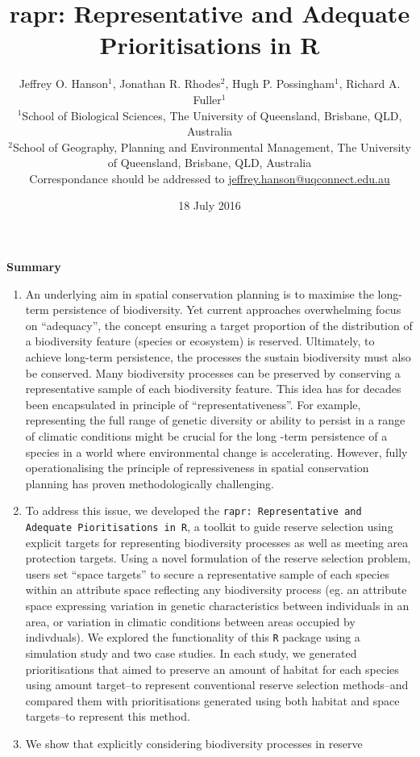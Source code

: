 \documentclass[11pt,]{article}
\title{rapr: Representative and Adequate Prioritisations in R}
\author{Jeffrey O. Hanson$^1$, Jonathan R. Rhodes$^2$, Hugh P. Possingham$^1$,
Richard A. Fuller$^1$\\$^1$School of Biological Sciences, The University
of Queensland, Brisbane, QLD, Australia\\$^2$School of Geography,
Planning and Environmental Management, The University of Queensland,
Brisbane, QLD, Australia\\Correspondance should be addressed to
\href{mailto:jeffrey.hanson@uqconnect.edu.au}{jeffrey.hanson@uqconnect.edu.au}}
\date{18 July 2016}
\renewcommand{\abstractname}{Summary}
\renewenvironment{abstract}
 {\small
  \begin{center}
  \bfseries \abstractname\vspace{-.5em}\vspace{0pt}
  \end{center}
  \list{} {%
   \setlength{\leftmargin}{2mm}
   \setlength{\rightmargin}{\leftmargin}%
  }%
  \item\relax}
{\endlist}
\begin{document}
\maketitle

\begin{abstract}
\begin{enumerate}
\def\labelenumi{\arabic{enumi}.}
\itemsep1pt\parskip0pt
\item
  An underlying aim in spatial conservation planning is to maximise the
  long-term persistence of biodiversity. Yet current approaches
  overwhelming focus on ``adequacy'', the concept ensuring a target
  proportion of the distribution of a biodiversity feature (species or
  ecosystem) is reserved. Ultimately, to achieve long-term persistence,
  the processes the sustain biodiversity must also be conserved. Many
  biodiversity processes can be preserved by conserving a representative
  sample of each biodiversity feature. This idea has for decades been
  encapsulated in principle of ``representativeness''. For example,
  representing the full range of genetic diversity or ability to persist
  in a range of climatic conditions might be crucial for the long -term
  persistence of a species in a world where environmental change is
  accelerating. However, fully operationalising the principle of
  repressiveness in spatial conservation planning has proven
  methodologically challenging.
\item
  To address this issue, we developed the
  \texttt{rapr: Representative and Adequate Pioritisations in R}, a
  toolkit to guide reserve selection using explicit targets for
  representing biodiversity processes as well as meeting area protection
  targets. Using a novel formulation of the reserve selection problem,
  users set ``space targets'' to secure a representative sample of each
  species within an attribute space reflecting any biodiversity process
  (eg. an attribute space expressing variation in genetic
  characteristics between individuals in an area, or variation in
  climatic conditions between areas occupied by indivduals). We explored
  the functionality of this \texttt{R} package using a simulation study
  and two case studies. In each study, we generated prioritisations that
  aimed to preserve an amount of habitat for each species using amount
  target--to represent conventional reserve selection methods--and
  compared them with prioritisations generated using both habitat and
  space targets--to represent this method.
\item
  We show that explicitly considering biodiversity processes in reserve

\end{enumerate}
\end{abstract}
\end{document}
